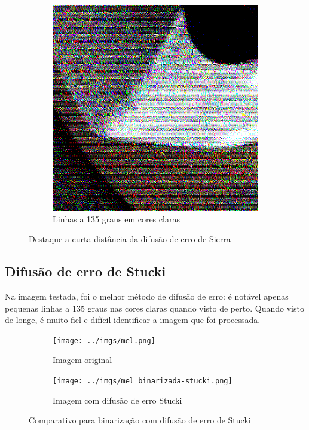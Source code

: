 \documentclass[brazilian,a4paper,twocolumn]{article}
\begin{document}
\begin{figure}
\begin{subfigure}{0.24\textwidth}
                \includegraphics[width=\textwidth,keepaspectratio]{../imgs/mel_binarizada-sierra-detalhe2.png}
                \caption{Linhas a 135 graus em cores claras}
            \end{subfigure}

            \caption{Destaque a curta distância da difusão de erro de Sierra}
            \label{fig:binarizada-sierra-destaque}
        \end{figure}

    \subsection{Difusão de erro de Stucki}

        Na imagem testada, foi o melhor método de difusão de erro: é notável apenas pequenas linhas a 135 graus nas cores claras quando visto de perto. Quando visto de longe, é muito fiel e difícil identificar a imagem que foi processada.

        \begin{figure}
            \centering
            \begin{subfigure}{0.24\textwidth}
                \texttt{[image: ../imgs/mel.png]}
                \caption{Imagem original}
            \end{subfigure}
            \begin{subfigure}{0.24\textwidth}
                \texttt{[image: ../imgs/mel\_binarizada-stucki.png]}
                \caption{Imagem com difusão de erro Stucki}
            \end{subfigure}

            \caption{Comparativo para binarização com difusão de erro de Stucki}
            \label{fig:binarizada-stucki}
        \end{figure}
\end{document}
